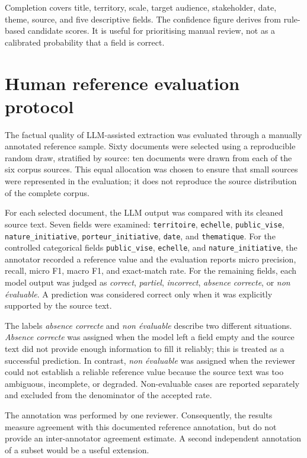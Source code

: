 Completion covers title, territory, scale, target audience, stakeholder, date,
theme, source, and five descriptive fields. The confidence figure derives from
rule-based candidate scores. It is useful for prioritising manual review, not as
a calibrated probability that a field is correct.

\section{Human reference evaluation protocol}

The factual quality of LLM-assisted extraction was evaluated through a manually
annotated reference sample. Sixty documents were selected using a reproducible
random draw, stratified by source: ten documents were drawn from each of the
six corpus sources. This equal allocation was chosen to ensure that small
sources were represented in the evaluation; it does not reproduce the source
distribution of the complete corpus.

For each selected document, the LLM output was compared with its cleaned source
text. Seven fields were examined: \texttt{territoire}, \texttt{echelle},
\texttt{public\_vise}, \texttt{nature\_initiative},
\texttt{porteur\_initiative}, \texttt{date}, and \texttt{thematique}.
For the controlled categorical fields \texttt{public\_vise},
\texttt{echelle}, and \texttt{nature\_initiative}, the annotator recorded a
reference value and the evaluation reports micro precision, recall, micro F1,
macro F1, and exact-match rate. For the remaining fields, each model output was
judged as \textit{correct}, \textit{partiel}, \textit{incorrect},
\textit{absence correcte}, or \textit{non \'{e}valuable}. A prediction was
considered correct only when it was explicitly supported by the source text.

The labels \textit{absence correcte} and \textit{non \'{e}valuable} describe
two different situations. \textit{Absence correcte} was assigned when the model
left a field empty and the source text did not provide enough information to fill
it reliably; this is treated as a successful prediction. In contrast,
\textit{non \'{e}valuable} was assigned when the reviewer could not establish a
reliable reference value because the source text was too ambiguous, incomplete, or
degraded. Non-evaluable cases are reported separately and excluded from the
denominator of the accepted rate.

The annotation was performed by one reviewer. Consequently, the results
measure agreement with this documented reference annotation, but do not provide
an inter-annotator agreement estimate. A second independent annotation of a
subset would be a useful extension.

